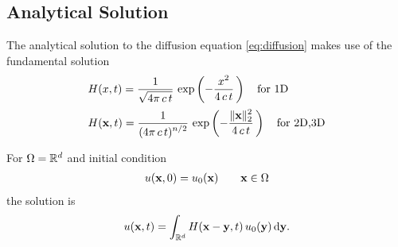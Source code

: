 \subsection{Analytical Solution}
The analytical solution to the diffusion equation \eqref{eq:diffusion} makes use of the fundamental solution
\begin{equation*}
  \begin{array}{lll}
    H(x,t) = \displaystyle\frac{\displaystyle{1}}{\displaystyle{\sqrt{4\pi\,c\,t}}}\,\exp\left(-\displaystyle\frac{\displaystyle{x^2}}{\displaystyle{4\,c\,t}}\,\right) \quad \text{for 1D}\\[4mm]
    H(\textbf{x},t) = \displaystyle\frac{\displaystyle{1}}{\displaystyle{(4\pi\,c\,t)^{n/2}}}\,\exp\left(-\displaystyle\frac{\displaystyle{\Vert \textbf{x}\Vert_2^2}}{\displaystyle{4\,c\,t}}\,\right) \quad \text{for 2D,3D}\\[4mm]
  \end{array}
\end{equation*}
For $\Omega=\mathbb{R}^d$ and initial condition
\begin{equation*}
  \begin{array}{lll}
    u(\textbf{x},0) = u_0(\textbf{x})\qquad \textbf{x} \in \Omega
  \end{array}
\end{equation*}
the solution is
\begin{equation*}
  \begin{array}{lll}
    u(\bfx,t) = \ds\int_{\R^d} H(\bfx - \bfy,t)\,u_0(\bfy)\,\d \bfy.
  \end{array}
\end{equation*}


